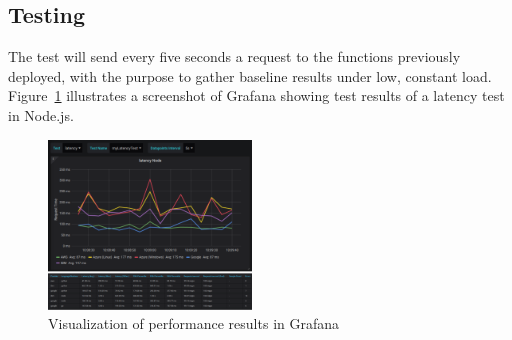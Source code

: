 \subsection{Testing}
The test will send every five seconds a request to the functions previously deployed, with the purpose to gather baseline results under low, constant load. %
Figure~\ref{fig:grafana} illustrates a screenshot of Grafana showing test results of a latency test in Node.js. 

\begin{figure}[!t]
\begin{center}
\includegraphics[width=0.48\textwidth]{bilder/grafana_combined.pdf}
\caption{Visualization of performance results in Grafana}
\label{fig:grafana}
\end{center}
\end{figure}





